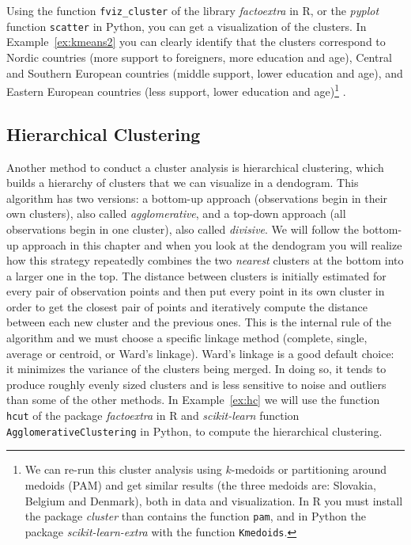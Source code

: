 
Using the function \texttt{fviz\_cluster} of the library \emph{factoextra} in R, or the \emph{pyplot} function \texttt{scatter} in Python, you can get a visualization of the clusters. In Example~\ref{ex:kmeans2} you can clearly identify that the clusters correspond to Nordic countries (more support to foreigners, more education and age), Central and Southern European countries (middle support, lower education and age), and Eastern European countries (less support, lower education and age)\footnote{We can re-run this cluster analysis using $k$-medoids or partitioning around medoids (PAM) and get similar results (the three medoids are: Slovakia,  Belgium and Denmark), both in data and visualization. In R you must install the package \emph{cluster} than contains the function \texttt{pam}, and in Python the package \emph{scikit-learn-extra} with the function \texttt{Kmedoids}.} .



\subsection{Hierarchical Clustering}\label{sec:hierarchical}

Another method to conduct a cluster analysis is hierarchical clustering, which builds a hierarchy of clusters that we can visualize in a dendogram.  This algorithm has two versions: a bottom-up approach (observations begin in their own clusters), also called \textit{agglomerative}, and a top-down approach (all observations begin in one cluster), also called \textit{divisive}. We will follow the bottom-up approach in this chapter and when you  look at the dendogram you will realize how this strategy repeatedly combines the two \textit{nearest} clusters at the bottom into a larger one in the top. The distance between clusters is initially estimated for every pair of observation points and then put every point in its own cluster in order to get the closest pair of points and iteratively compute the distance between each new cluster and the previous ones. This is the internal rule of the algorithm and we must choose a specific linkage method (complete, single, average or centroid, or Ward's linkage). Ward's linkage is a good default choice: it minimizes the variance of the clusters being merged. In doing so, it tends to produce roughly evenly sized clusters and is less sensitive to noise and outliers than some of the other methods.
In Example~\ref{ex:hc} we will use the function \texttt{hcut} of the package \emph{factoextra} in R and \emph{scikit-learn} function \texttt{AgglomerativeClustering} in Python, to compute the hierarchical clustering.

